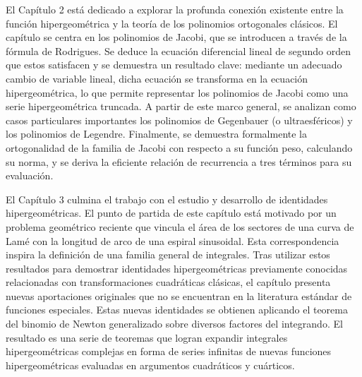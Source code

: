 \documentclass[12pt,a4paper]{book}
\begin{document}
El Capítulo 2 está dedicado a explorar la profunda conexión existente entre la función hipergeométrica y la teoría de los polinomios ortogonales clásicos. El capítulo se centra en los polinomios de Jacobi, que se introducen a través de la fórmula de Rodrigues. Se deduce la ecuación diferencial lineal de segundo orden que estos satisfacen y se demuestra un resultado clave: mediante un adecuado cambio de variable lineal, dicha ecuación se transforma en la ecuación hipergeométrica, lo que permite representar los polinomios de Jacobi como una serie hipergeométrica truncada. A partir de este marco general, se analizan como casos particulares importantes los polinomios de Gegenbauer (o ultraesféricos) y los polinomios de Legendre. Finalmente, se demuestra formalmente la ortogonalidad de la familia de Jacobi con respecto a su función peso, calculando su norma, y se deriva la eficiente relación de recurrencia a tres términos para su evaluación.

El Capítulo 3 culmina el trabajo con el estudio y desarrollo de identidades hipergeométricas. El punto de partida de este capítulo está motivado por un problema geométrico reciente que vincula el área de los sectores de una curva de Lamé con la longitud de arco de una espiral sinusoidal. Esta correspondencia inspira la definición de una familia general de integrales. Tras utilizar estos resultados para demostrar identidades hipergeométricas previamente conocidas relacionadas con transformaciones cuadráticas clásicas, el capítulo presenta nuevas aportaciones originales que no se encuentran en la literatura estándar de funciones especiales. Estas nuevas identidades se obtienen aplicando el teorema del binomio de Newton generalizado sobre diversos factores del integrando. El resultado es una serie de teoremas que logran expandir integrales hipergeométricas complejas en forma de series infinitas de nuevas funciones hipergeométricas evaluadas en argumentos cuadráticos y cuárticos.

\pagestyle{intro}


\newpage
\thispagestyle{empty} 

\fancyhf{} 
\fancyhead[LE]{\thepage}
\fancyhead[RE]{\textit{\nouppercase{\leftmark}}}
\fancyhead[RO]{\thepage}
\fancyhead[LO]{\textit{\nouppercase{\rightmark}}}
\renewcommand{\headrulewidth}{0.4pt}
\renewcommand{\footrulewidth}{0pt}
\makeatletter
\renewcommand{\chaptermark}[1]{%
  \markboth{Capítulo \thechapter. \ #1}{}}
\renewcommand{\sectionmark}[1]{%
  \markright{\thesection. \ #1}}
\makeatother
\end{document}
